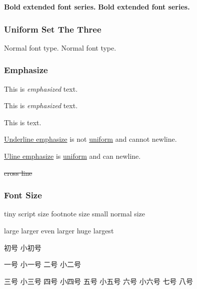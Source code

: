 \textbf{Bold extended font series.} {\bfseries Bold extended font series.}

\subsubsection{Uniform Set The Three}
\textnormal{Normal font type.} {\normalfont Normal font type.}

\subsubsection{Emphasize}
This is \emph{emphasized} text.

This is {\em emphasized\/} text.

This is  text.

\underline{Underline emphasize} is not \underline{uniform} and cannot newline.

\uline{Uline emphasize} is \uline{uniform} and can newline. %

  \sout{cross line}       %


\subsubsection{Font Size}
{\tiny tiny} {\scriptsize script size} {\footnotesize footnote size} {\small small} {\normalsize normal size}

{\large large} {\Large larger} {\LARGE even larger} {\huge huge} {\Huge largest}

{ 初号} { 小初号}

{ 一号} { 小一号} { 二号} { 小二号}

{ 三号} { 小三号} { 四号} { 小四号} { 五号} { 小五号} { 六号} { 小六号} { 七号} { 八号}
